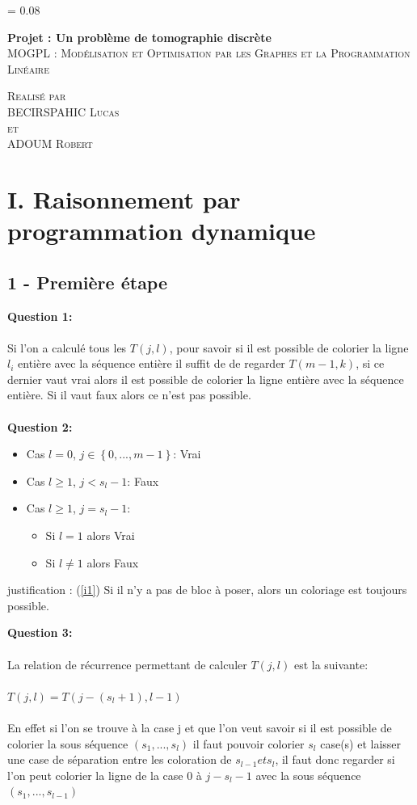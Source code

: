 \documentclass[a4paper]{memoir}
\newlength{\drop}
\newcommand*{\titleM}{\begingroup %
\drop = 0.08\textheight
\centering
\vspace*{\drop}

{\Huge\bfseries Projet : Un problème de tomographie discrète}\\[\baselineskip]

{\large\scshape MOGPL : Modélisation et Optimisation par les Graphes et la Programmation Linéaire}\\[\baselineskip]

\begin{vplace}[0.7]
    \textit{}
\end{vplace}

{\scshape Realisé par\\ BECIRSPAHIC Lucas\\ et\\ ADOUM Robert}\par

\vspace*{2\drop}
\endgroup}
\begin{document}
    \begin{center}
    \titleM 
    \end{center}
    \clearpage
    
    \begin{center}
    \tableofcontents
    \end{center}
    
    \newpage
    
    \section{I. Raisonnement par programmation dynamique}
    \subsection{1 - Première étape}
    \textbf{Question 1:}\\\\ Si l’on a calculé tous les $T(j, l)$, pour savoir si il est possible de colorier la ligne $l_{i}$ entière avec la séquence entière  il suffit de de regarder $T(m-1, k)$, si ce dernier vaut vrai alors il est possible de colorier la ligne entière avec la séquence entière. Si il vaut faux alors ce n'est pas possible.\\\\
    \textbf{Question 2:}
    \begin{itemize}
    \item Cas $l = 0$, $j\in{\left\lbrace 0,...,m-1 \right\rbrace }$: Vrai
      \label{i1}
		\item Cas $l \geqslant 1$, $j < s_{l}-1$: Faux
		\item Cas $l \geqslant 1$, $j = s_{l}-1$:
		\begin{itemize}
			\item Si $l = 1$ alors Vrai 
			\item Si $l \neq 1$ alors Faux
		\end{itemize}
    \end{itemize}
    justification : (\ref{i1}) Si il n'y a pas de bloc à poser, alors un coloriage est toujours possible.
 	
 	\textbf{Question 3:}\\\\
 	La relation de récurrence permettant de calculer $T(j,l)$ est la suivante:\\\\
 	$T(j, l) = T(j-(s_{l}+1),l-1)$\\\\
 	En effet si l'on se trouve à la case j et que l'on veut savoir si il est possible de colorier la sous séquence $(s_{1}, ..., s_{l})$ il faut pouvoir colorier $s_{l}$ case(s) et laisser une case de séparation entre les coloration de $s_{l-1} et s_{l}$, il faut donc regarder si l'on peut colorier la ligne de la case 0 à $j - s_{l} - 1$ avec la sous séquence $(s_{1}, ..., s_{l-1})$
   
\end{document}
